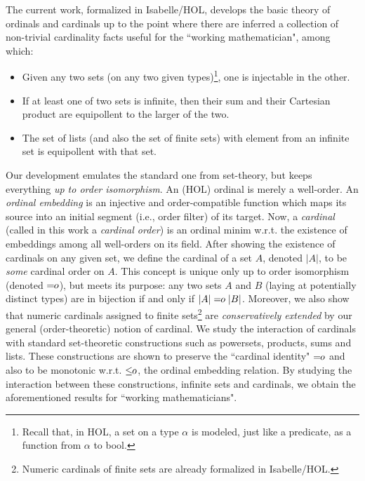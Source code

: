 The current work, formalized in Isabelle/HOL, develops the basic theory of ordinals and cardinals
up to the point where there are inferred a collection of non-trivial cardinality facts useful
for the ``working mathematician", among which:
\begin{itemize}
\item Given any two sets (on any two given types)\footnote{Recall that, in HOL, a set
on a type $\alpha$ is modeled, just like a predicate, as a function from $\alpha$ to \textsf{bool}.},
one is injectable in the other.
\item If at least one of two sets is infinite, then their sum and their Cartesian product are equipollent
to the larger of the two.
\item The set of lists (and also the set of finite sets) with element from an
infinite set is equipollent with that set.
\end{itemize}

Our development emulates the standard one from set-theory, but keeps everything
{\em up to order isomorphism}.
An (HOL) ordinal is merely a well-order.  An {\em ordinal embedding} is an
injective and order-compatible function which maps its source into an initial segment
(i.e., order filter) of its target.  Now, a {\em cardinal} (called in this work a {\em cardinal order})
is an ordinal minim w.r.t. the existence of embeddings among all
well-orders on its field.  After showing the existence of cardinals on any given set,
we define the cardinal of a set $A$, denoted $|A|$, to be {\em some} cardinal order
on $A$.  This concept is unique only up to order isomorphism (denoted $\mbox{$=\!\!o$}$), but meets
its purpose: any two sets $A$ and $B$ (laying at potentially distinct types)
are in bijection if and only if $|A|\;\mbox{$=\!\!o$}\;|B|$. Moreover, we also show that numeric cardinals
assigned to finite sets\footnote{Numeric cardinals of finite sets are already formalized in
Isabelle/HOL.}
are {\em conservatively extended} by our general (order-theoretic) notion of
cardinal. We study the interaction of cardinals with standard set-theoretic
constructions such as powersets, products, sums and lists.  These constructions are shown
to preserve the ``cardinal identity" $\mbox{$=\!\!o$}$ and also to be monotonic w.r.t. $\mbox{$\leq\!\!o$}$, the ordinal
embedding relation.  By studying the interaction between these constructions, infinite sets and
cardinals, we obtain the
aforementioned results for ``working mathematicians".

